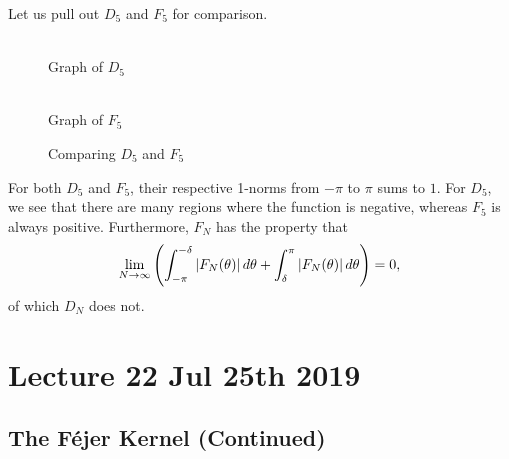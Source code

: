 \documentclass[notoc,notitlepage]{tufte-book}
\begin{document}
Let us pull out $D_5$ and $F_5$ for comparison.

\begin{figure}[ht]
  \centering
  \begin{minipage}[b]{0.5\linewidth}
    \centering
     \\
    Graph of $D_5$
  \end{minipage}%
  \begin{minipage}[b]{.5\linewidth}
    \centering
     \\
    Graph of $F_5$
  \end{minipage}
  \caption{Comparing $D_5$ and $F_5$}
  \label{fig:comparing_d_5_and_f_5_}
\end{figure}

For both $D_5$ and $F_5$, their respective 1-norms
from $-\pi$ to $\pi$ sums to $1$.
For $D_5$, we see that there are many regions where the function is
negative, whereas $F_5$ is always positive.
Furthermore, $F_N$ has the property that
\begin{equation*}
  \lim_{N \to \infty} \left( 
    \int_{-\pi}^{-\delta} \left|F_N(\theta)\right| \mathop{}\!d{\theta} 
    + \int_{\delta}^{\pi} \left|F_N(\theta)\right| \mathop{}\!d{\theta}
  \right) = 0,
\end{equation*}
of which $D_N$ does not.



\chapter{Lecture 22 Jul 25th 2019}%
\label{chp:lecture_22_jul_25th_2019}

\section{The Féjer Kernel (Continued)}%
\label{sec:the_fejer_kernel_continued}
\end{document}
